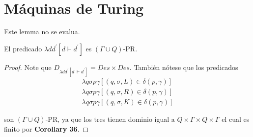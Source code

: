 \section{Máquinas de Turing}

  \begin{lemma}
    \PN Este lemma no se evalua.
  \end{lemma}

  \begin{lemma}
  	\PN El predicado $\lambda dd^{\prime} \left[d \vdash d^{\prime}\right]$ es $(\Gamma \cup Q)$-PR.
  \end{lemma}
	\begin{proof}
	  \PN Note que $D_{\lambda dd^{\prime}\left[d\ \vdash d^{\prime }\right] }=Des\times Des$. También nótese que los
    predicados
    \begin{eqnarray*}
      \lambda q\sigma p\gamma \left[ (q,\sigma ,L)\in \delta (p,\gamma )\right] \\
      \lambda q\sigma p\gamma \left[ (q,\sigma ,R)\in \delta (p,\gamma )\right] \\
      \lambda q\sigma p\gamma \left[ (q,\sigma ,K)\in \delta (p,\gamma )\right]
    \end{eqnarray*}

    \PN son $(\Gamma \cup Q)$-PR, ya que los tres tienen dominio igual a $Q \times \Gamma \times Q \times \Gamma$ el
    cual es finito por \textbf{Corollary 36}.


\end{proof}
